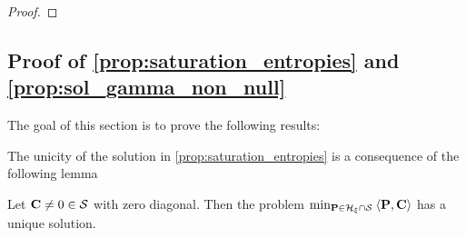 \begin{proof}
\end{proof}

\subsection{Proof of \cref{prop:saturation_entropies} and \cref{prop:sol_gamma_non_null} \label{proof:main_props}}

The goal of this section is to prove the following results:

\saturation*

\solvingsea*

The unicity of the solution in \cref{prop:saturation_entropies} is a consequence of the following lemma

\begin{lemma} 
\label{lemma:unicity}
  Let $\mathbf{C} \neq 0 \in \mathcal{S}$ with zero diagonal. Then the problem $\min_{\mathbf{P} \in \mathcal{H}_{\xi} \cap \mathcal{S}} \: \langle \mathbf{P}, \mathbf{C} \rangle$ has a unique solution.
\end{lemma}

